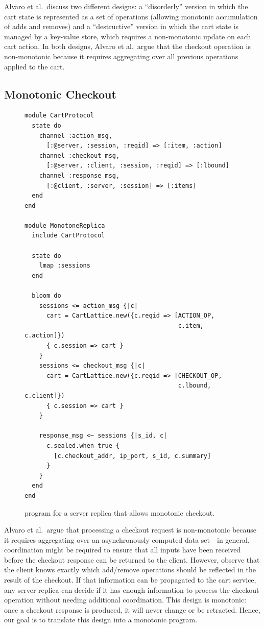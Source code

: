Alvaro et al.\ discuss two different designs: a ``disorderly'' version in which
the cart state is represented as a set of operations (allowing monotonic
accumulation of adds and removes) and a ``destructive'' version in which the
cart state is managed by a key-value store, which requires a non-monotonic
update on each cart action. In both designs, Alvaro et al.\ argue that the
checkout operation is non-monotonic because it requires aggregating over all
previous operations applied to the cart.

\subsection{Monotonic Checkout}
\begin{figure}[t]
\begin{scriptsize}

\begin{lstlisting}
module CartProtocol
  state do
    channel :action_msg,
      [:@server, :session, :reqid] => [:item, :action]
    channel :checkout_msg,
      [:@server, :client, :session, :reqid] => [:lbound]
    channel :response_msg,
      [:@client, :server, :session] => [:items]
  end
end

module MonotoneReplica
  include CartProtocol

  state do
    lmap :sessions
  end

  bloom do
    sessions <= action_msg {|c|
      cart = CartLattice.new({c.reqid => [ACTION_OP,
                                          c.item, c.action]})
      { c.session => cart }
    }
    sessions <= checkout_msg {|c|
      cart = CartLattice.new({c.reqid => [CHECKOUT_OP,
                                          c.lbound, c.client]})
      { c.session => cart }
    }

    response_msg <~ sessions {|s_id, c|
      c.sealed.when_true {
        [c.checkout_addr, ip_port, s_id, c.summary]
      }
    }
  end
end
\end{lstlisting}
\end{scriptsize}
\caption{\lang program for a server replica that allows monotonic checkout.}
\label{fig:monotone-cart}
\end{figure}

Alvaro et al.\ argue that processing a checkout request is non-monotonic because
it requires aggregating over an asynchronously computed data set---in general,
coordination might be required to ensure that all inputs have been received
before the checkout response can be returned to the client. However, observe
that the client knows exactly which add/remove operations should be reflected in
the result of the checkout. If that information can be propagated to the cart
service, any server replica can decide if it has enough information to process
the checkout operation without needing additional coordination. This design is
monotonic: once a checkout response is produced, it will never change or be
retracted. Hence, our goal is to translate this design into a monotonic \lang
program.

